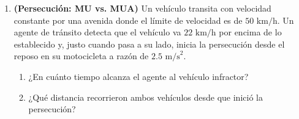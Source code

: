 \documentclass[11pt, letterpaper]{article}
\newif\ifmostrarrespuestas
\newcommand{\respuesta}[1]{
	\ifmostrarrespuestas
	\par\vspace{0.2cm}
	\begin{tcolorbox}[colback=blue!5!white, colframe=valblue, boxrule=0.5pt, arc=1mm, left=2mm, right=2mm, top=1.5mm, bottom=1.5mm]
		\footnotesize \textbf{\textcolor{valblue}{Solución:}} \textcolor{blue!80!black}{#1}
	\end{tcolorbox}
	\vspace{0.2cm}
	\fi
}
\begin{document}
\begin{enumerate}[leftmargin=*, itemsep=0.6cm]
		\item \textbf{(Persecución: MU vs. MUA)} Un vehículo transita con velocidad constante por una avenida donde el límite de velocidad es de $50\text{ km/h}$. Un agente de tránsito detecta que el vehículo va $22\text{ km/h}$ por encima de lo establecido y, justo cuando pasa a su lado, inicia la persecución desde el reposo en su motocicleta a razón de $2.5\text{ m/s}^2$.
		\begin{enumerate}[label=\alph*., itemsep=0.2cm]
			\item ¿En cuánto tiempo alcanza el agente al vehículo infractor?
			\item ¿Qué distancia recorrieron ambos vehículos desde que inició la persecución?
		\end{enumerate}
		\respuesta{
			Velocidad constante del infractor (MU): $v_i = 50 + 22 = 72\text{ km/h} = \mathbf{20\text{ m/s}} \implies x_i = 20t$.\\
			Movimiento del agente ($\text{MUA}(+)$): $v_{0p} = 0$, $a_p = 2.5\text{ m/s}^2 \implies x_p = \frac{2.5t^2}{2} = 1.25t^2$.\\[0.1cm]
			\textbf{a)} Igualando posiciones ($x_i = x_p$): $20t = 1.25t^2 \implies t = \frac{20}{1.25} = \mathbf{16\text{ s}}$.\\[0.1cm]
			\textbf{b)} Distancia recorrida: $x = 20\text{ m/s} \cdot 16\text{ s} = \mathbf{320\text{ m}}$.
		}
		

\end{enumerate}
\end{document}
